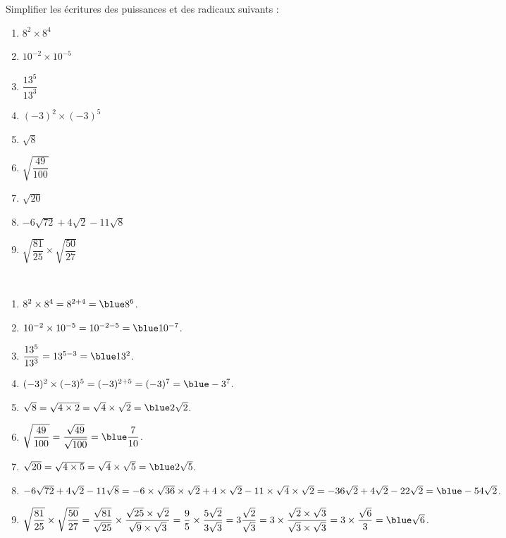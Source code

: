 \begin{exercice} %
   Simplifier les écritures des puissances et des radicaux suivants :       \vspace*{-4mm}
   \begin{multicols}{3}
      \begin{enumerate}
         \item $8^2\times8^4$ \smallskip
         \item $10^{-2}\times10^{-5}$ \medskip
         \item $\dfrac{13^5}{13^3}$
         \item $(-3)^2\times(-3)^5$ \smallskip
         \item $\sqrt{8}$ \medskip
         \item $\sqrt{\dfrac{49}{100}}$
         \item $\sqrt{20}$ \smallskip
         \item $-6\sqrt{72} + 4\sqrt{2} - 11 \sqrt{8}$ \medskip
         \item $\sqrt{\dfrac{81}{25}}\times\sqrt{\dfrac{50}{27}}$
      \end{enumerate}
   \end{multicols}
\end{exercice}

\begin{corrige}
\ \\ [-5mm]
   \begin{enumerate}
      \item $8^2\times8^4 =8^{2+4} ={\blue 8^6}$.
      \item $10^{-2}\times10^{-5} =10^{-2-5} ={\blue 10^{-7}}$. \smallskip
      \item $\dfrac{13^5}{13^3} =13^{5-3} ={\blue 13^2}$. \smallskip
      \item $(-3)^2\times(-3)^5 =(-3)^{2+5} =(-3)^7 ={\blue -3^7} $.
      \item $\sqrt{8} =\sqrt{4\times2} =\sqrt4\times\sqrt2 ={\blue 2\sqrt2}$. \smallskip
      \item $\sqrt{\dfrac{49}{100}} =\dfrac{\sqrt{49}}{\sqrt{100}} ={\blue \dfrac{7}{10}} $. \smallskip
      \item $\sqrt{20} =\sqrt{4\times5} =\sqrt{4}\times\sqrt{5} ={\blue 2\sqrt5}$.
      \item $-6\sqrt{72} + 4\sqrt{2} - 11 \sqrt{8} =-6\times\sqrt{36}\times\sqrt2 + 4\times\sqrt{2} - 11\times\sqrt4\times\sqrt2 =-36\sqrt2+4\sqrt2-22\sqrt2 = {\blue -54\sqrt2}$. \smallskip
      \item $\sqrt{\dfrac{81}{25}}\times\sqrt{\dfrac{50}{27}} =\dfrac{\sqrt{81}}{\sqrt{25}}\times\dfrac{\sqrt{25}\times\sqrt2}{\sqrt9\times\sqrt3} =\dfrac95\times\dfrac{5\sqrt2}{3\sqrt3} =3\dfrac{\sqrt2}{\sqrt3} =3\times\dfrac{\sqrt2\times\sqrt3}{\sqrt3\times\sqrt3} =3\times\dfrac{\sqrt6}{3} ={\blue \sqrt6}$.     
   \end{enumerate}
\end{corrige}


